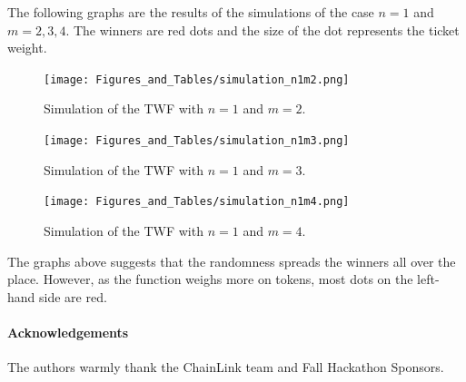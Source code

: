 \documentclass[runningheads]{llncs}
\begin{document}
The following graphs are the results of the simulations of the case $n=1$ and $m=2,3,4$. The winners are red dots and the size of the dot represents the ticket weight.
\begin{figure}[H]
\centering
\texttt{[image: Figures\_and\_Tables/simulation\_n1m2.png]}
\caption{Simulation of the TWF with $n=1$ and $m=2$. }
\label{fig:Lorenz}
\end{figure}
\begin{figure}[H]
\centering
\texttt{[image: Figures\_and\_Tables/simulation\_n1m3.png]}
\caption{Simulation of the TWF with $n=1$ and $m=3$. }
\label{fig:Lorenz}
\end{figure}
\begin{figure}[H]
\centering
\texttt{[image: Figures\_and\_Tables/simulation\_n1m4.png]}
\caption{Simulation of the TWF with $n=1$ and $m=4$. }
\label{fig:Lorenz}
\end{figure}

The graphs above suggests that the randomness spreads the winners all over the place. However, as the function weighs more on tokens, most dots on the left-hand side are red.







\paragraph*{Acknowledgements} 
The authors warmly thank the ChainLink team and Fall Hackathon Sponsors.

%
%
% 
% 
%



\end{document}
